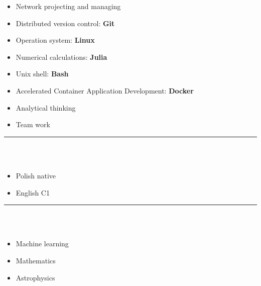 \documentclass[10pt]{article}
\begin{document}
\begin{minipage}[t]{0.30\textwidth}
\begin{itemize}[leftmargin=*]
            \item Network projecting and managing
            \item Distributed version control: \textbf{Git}
            \item Operation system: \textbf{Linux}
            \item Numerical calculations: \textbf{Julia}
            \item Unix shell: \textbf{Bash} 
            \item Accelerated Container Application Development: \textbf{Docker}
            \item Analytical thinking
            \item Team work
        \end{itemize}
        \rule{6cm}{1pt} \\ \\
        \fontsize{10pt}{10pt}
        \begin{itemize}[leftmargin=*]
            \setlength{\parskip}{0pt}
            \item Polish native
            \item English C1
        \end{itemize}
        \rule{6cm}{1pt} \\ \\
        \fontsize{10pt}{10pt}
        \begin{itemize}[leftmargin=*]
            \setlength{\parskip}{0pt}
            \item Machine learning
            \item Mathematics 
            \item Astrophysics
        \end{itemize}
    \end{minipage}
    \hfill %
\end{document}

